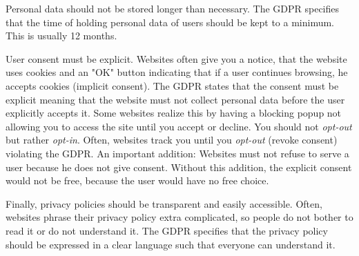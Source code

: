 Personal data should not be stored longer than necessary. The GDPR specifies that the time of holding personal data of
users should be kept to a minimum. This is usually 12 months.

User consent must be explicit. Websites often give you a notice, that the website uses cookies and an "OK" button
indicating that if a user continues browsing, he accepts cookies (implicit consent). The GDPR states that the consent must be explicit
meaning that the website must not collect personal data before the user explicitly accepts it. Some websites realize
this by having a blocking popup not allowing you to access the site until you accept or decline. You should not
\emph{opt-out} but rather \emph{opt-in}. Often, websites track you until you \emph{opt-out} (revoke consent) violating
the GDPR. An important addition: Websites must not refuse to serve a user because he does not give consent. Without this
addition, the explicit consent would not be free, because the user would have no free choice.

Finally, privacy policies should be transparent and easily accessible. Often, websites phrase their privacy policy
extra complicated, so people do not bother to read it or do not understand it. The GDPR specifies that the privacy policy
should be expressed in a clear language such that everyone can understand it.

